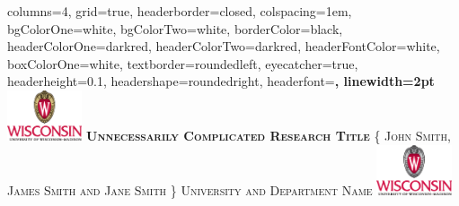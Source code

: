 \documentclass[landscape,a0paper,fontscale=0.3]{baposter}
\begin{document}
\begin{poster}
{
columns=4,
grid=true,
headerborder=closed, %
colspacing=1em, %
bgColorOne=white, %
bgColorTwo=white, %
borderColor=black, %
headerColorOne=darkred, %
headerColorTwo=darkred, %
headerFontColor=white, %
boxColorOne=white, %
textborder=roundedleft, %
eyecatcher=true, %
headerheight=0.1\textheight, %
headershape=roundedright, %
headerfont=\Large\bf, %
linewidth=2pt %
}
%
{\includegraphics[height=4em]{UWlogo_warm.eps}} %
{\bf\textsc{Unnecessarily Complicated Research Title}\vspace{0.5em}} %
{\textsc{\{ John Smith, James Smith and Jane Smith \} \hspace{12pt} University and Department Name}} %
{\includegraphics[height=4em]{UWlogo_cool.eps}} %



\end{poster}
\end{document}
